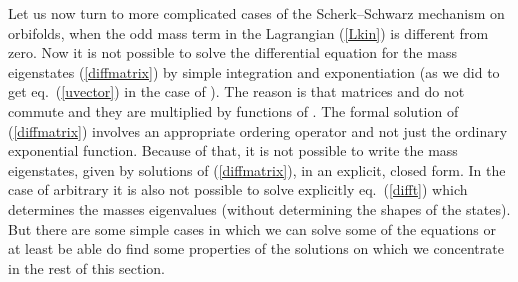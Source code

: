\documentclass[a4paper,12pt]{article}
\def\si{\sigma}
\begin{document}
Let us now turn to more complicated cases of the Scherk--Schwarz
mechanism on orbifolds, when the odd mass term in the Lagrangian
(\ref{Lkin}) is different from zero. Now it is not possible to solve
the differential equation for the mass eigenstates (\ref{diffmatrix})
by simple integration and exponentiation (as we did to get eq.\
(\ref{uvector}) in the case of \coordHE{}). The reason is that matrices
\myHighlight{$\si_2$}\coordHE{} and \myHighlight{$\si_3$}\coordHE{} do not commute and they are multiplied by
functions of \myHighlight{$y$}\coordHE{}. The formal solution of 
(\ref{diffmatrix}) involves an appropriate ordering operator and not
just the ordinary exponential function. Because of that, it is not
possible to write the mass eigenstates, given by solutions of
(\ref{diffmatrix}), in an explicit, closed form. In the case of
arbitrary \coordHE{} it is also not possible to solve explicitly eq.\
(\ref{difft}) which determines the masses eigenvalues (without
determining the shapes of the states). 
But there are some simple cases in which we can solve some
of the equations or at least be able do find some properties of the
solutions on which we concentrate in the rest of this section.
\end{document}
